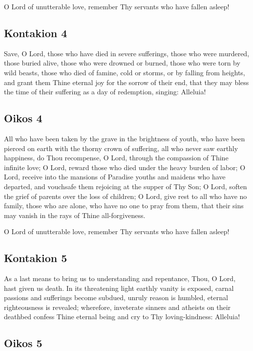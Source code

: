 O Lord of unutterable love, remember Thy servants who have fallen asleep!

\subsection{Kontakion 4}

Save, O Lord, those who have died in severe sufferings, those who were murdered, those buried alive, those who were drowned or burned, those who were torn by wild beasts, those who died of famine, cold or storms, or by falling from heights, and grant them Thine eternal joy for the sorrow of their end, that they may bless the time of their suffering as a day of redemption, singing: Alleluia!

\subsection{Oikos 4}

All who have been taken by the grave in the brightness of youth, who have been pierced on earth with the thorny crown of suffering, all who never saw earthly happiness, do Thou recompense, O Lord, through the compassion of Thine infinite love; O Lord, reward those who died under the heavy burden of labor; O Lord, receive into the mansions of Paradise youths and maidens who have departed, and vouchsafe them rejoicing at the supper of Thy Son; O Lord, soften the grief of parents over the loss of children; O Lord, give rest to all who have no family, those who are alone, who have no one to pray from them, that their sins may vanish in the rays of Thine all-forgiveness.

O Lord of unutterable love, remember Thy servants who have fallen asleep!

\subsection{Kontakion 5}

As a last means to bring us to understanding and repentance, Thou, O Lord, hast given us death. In its threatening light earthly vanity is exposed, carnal passions and sufferings become subdued, unruly reason is humbled, eternal righteousness is revealed; wherefore, inveterate sinners and atheists on their deathbed confess Thine eternal being and cry to Thy loving-kindness: Alleluia!

\subsection{Oikos 5}

